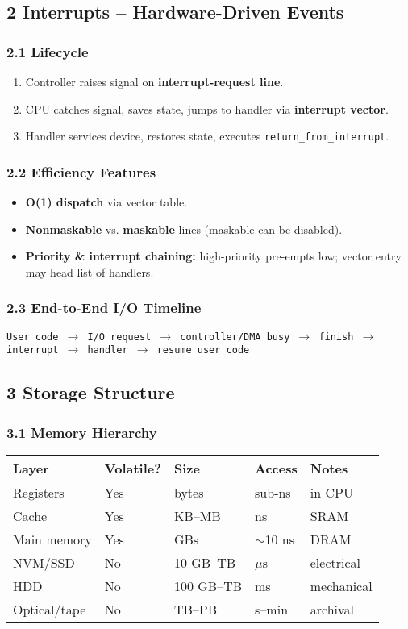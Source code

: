 \documentclass{article}
\begin{document}
\subsection*{2 Interrupts – Hardware-Driven Events}
\subsubsection*{2.1 Lifecycle}
\begin{enumerate}[label=\arabic*.]
    \item Controller raises signal on \textbf{interrupt-request line}.
    \item CPU catches signal, saves state, jumps to handler via \textbf{interrupt vector}.
    \item Handler services device, restores state, executes \texttt{return\_from\_interrupt}.
\end{enumerate}

\subsubsection*{2.2 Efficiency Features}
\begin{itemize}
    \item \textbf{O(1) dispatch} via vector table.
    \item \textbf{Nonmaskable} vs. \textbf{maskable} lines (maskable can be disabled).
    \item \textbf{Priority \& interrupt chaining:} high-priority pre-empts low; vector entry may head list of handlers.
\end{itemize}

\subsubsection*{2.3 End-to-End I/O Timeline}
\texttt{User code $\rightarrow$ I/O request $\rightarrow$ controller/DMA busy $\rightarrow$ finish $\rightarrow$ interrupt $\rightarrow$ handler $\rightarrow$ resume user code}

\subsection*{3 Storage Structure}
\subsubsection*{3.1 Memory Hierarchy}
\centering
\begin{tabular}{lllll}
\toprule
\textbf{Layer} & \textbf{Volatile?} & \textbf{Size} & \textbf{Access} & \textbf{Notes} \\
\midrule
Registers & Yes & bytes & sub-ns & in CPU \\
Cache & Yes & KB–MB & ns & SRAM \\
Main memory & Yes & GBs & $\sim$10 ns & DRAM \\
NVM/SSD & No & 10 GB–TB & $\mu$s & electrical \\
HDD & No & 100 GB–TB & ms & mechanical \\
Optical/tape & No & TB–PB & s–min & archival \\
\bottomrule
\end{tabular}
\vspace{\baselineskip}
\end{document}
